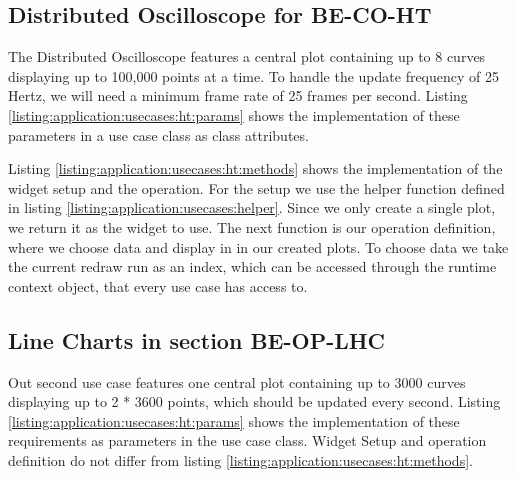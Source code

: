 

\subsection{Distributed Oscilloscope for BE-CO-HT}

The Distributed Oscilloscope features a central plot containing up to 8 curves
displaying up to 100,000 points at a time. To handle the update frequency of 25
Hertz, we will need a minimum frame rate of 25 frames per second. Listing
\ref{listing:application:usecases:ht:params} shows the implementation of these
parameters in a use case class as class attributes.



Listing \ref{listing:application:usecases:ht:methods} shows the implementation
of the widget setup and the operation. For the setup we use the helper function
defined in listing \ref{listing:application:usecases:helper}. Since we only
create a single plot, we return it as the widget to use. The next function is
our operation definition, where we choose data and display in in our created
plots. To choose data we take the current redraw run as an index, which can be
accessed through the runtime context object, that every use case has access to.



\subsection{Line Charts in section BE-OP-LHC}

Out second use case features one central plot containing up to 3000 curves
displaying up to 2 * 3600 points, which should be updated every second. Listing
\ref{listing:application:usecases:ht:params} shows the implementation of these
requirements as parameters in the use case class. Widget Setup and operation
definition do not differ from listing
\ref{listing:application:usecases:ht:methods}.

